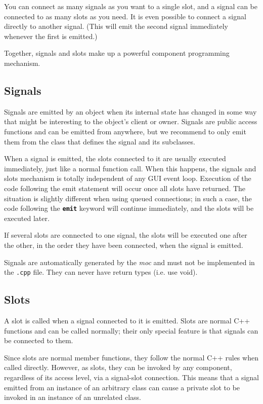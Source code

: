 You can connect as many signals as you want to a single slot, and a signal can
be connected to as many slots as you need. It is even possible to connect a
signal directly to another signal. (This will emit the second signal immediately
whenever the first is emitted.)

Together, signals and slots make up a powerful component programming mechanism.\cite{Qt:signal-slot}

\subsection{Signals}
\label{ssec:soft-signal}
Signals are emitted by an object when its internal state has changed in some way
that might be interesting to the object's client or owner. Signals are public
access functions and can be emitted from anywhere, but we recommend to only emit
them from the class that defines the signal and its subclasses.

When a signal is emitted, the slots connected to it are usually executed
immediately, just like a normal function call. When this happens, the signals
and slots mechanism is totally independent of any GUI event loop. Execution of
the code following the emit statement will occur once all slots have returned.
The situation is slightly different when using queued connections; in such a
case, the code following the \textbf{\texttt{emit}} keyword will continue
immediately, and the slots will be executed later.

If several slots are connected to one signal, the slots will be executed one
after the other, in the order they have been connected, when the signal is
emitted.

Signals are automatically generated by the \emph{moc} and must not be implemented in
the \texttt{.cpp} file. They can never have return types (i.e. use void).\cite{Qt:signal-slot}

\subsection{Slots}
\label{ssec:soft-slots}
A slot is called when a signal connected to it is emitted. Slots are normal C++
functions and can be called normally; their only special feature is that signals
can be connected to them.

Since slots are normal member functions, they follow the normal C++ rules when
called directly. However, as slots, they can be invoked by any component,
regardless of its access level, via a signal-slot connection. This means that a
signal emitted from an instance of an arbitrary class can cause a private slot
to be invoked in an instance of an unrelated class.

